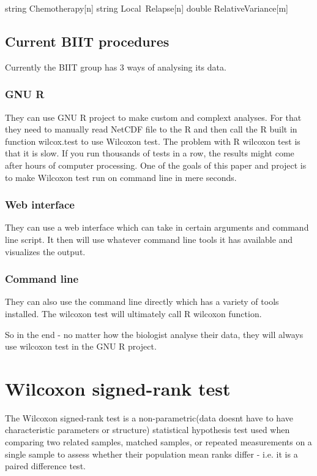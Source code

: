 \documentclass[12pt]{article}
\begin{document}
string Chemotherapy[n]
string Local\ Relapse[n]
double RelativeVariance[m]

\subsection{Current BIIT procedures}
Currently the BIIT group has 3 ways of analysing its data.
\subsubsection{GNU R}
They can use GNU R project to make custom and complext analyses. For that they need to manually read NetCDF file to the R and then call the R built in function wilcox.test to use Wilcoxon test. The problem with R wilcoxon test is that it is slow. If you run thousands of tests in a row, the results might come after hours of computer processing. One of the goals of this paper and project is to make Wilcoxon test run on command line in mere seconds.
\subsubsection{Web interface}
They can use a web interface which can take in certain arguments and command line script. It then will use whatever command line tools it has available and visualizes the output.

\subsubsection{Command line}
They can also use the command line directly which has a variety of tools installed. The wilcoxon test will ultimately call R wilcoxon function.

So in the end - no matter how the biologist analyse their data, they will always use wilcoxon test in the GNU R project.

\newpage

\section{Wilcoxon signed-rank test}

The Wilcoxon signed-rank test is a non-parametric(data doesnt have to have characteristic parameters or structure) statistical hypothesis test used when comparing two related samples, matched samples, or repeated measurements on a single sample to assess whether their population mean ranks differ - i.e. it is a paired difference test.
\end{document}
